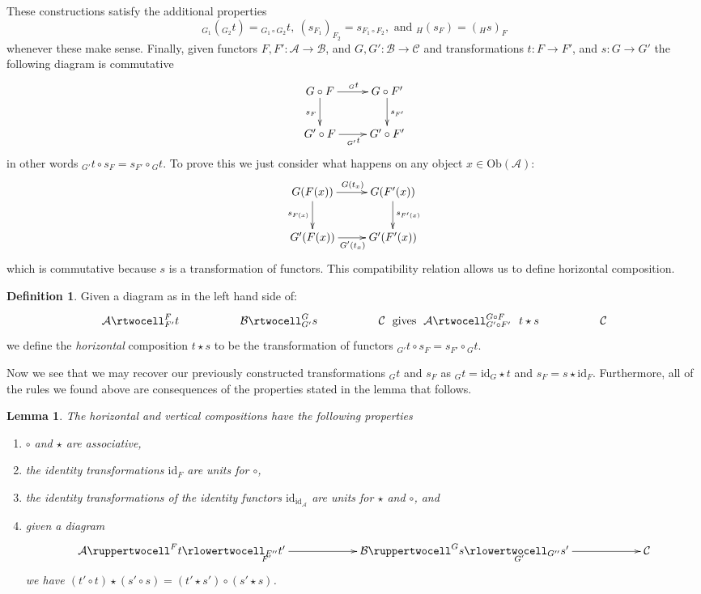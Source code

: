 \documentclass{amsart}
\newtheorem{lemma}[theorem]{Lemma}
\theoremstyle{definition}
\newtheorem{definition}[theorem]{Definition}
\theoremstyle{remark}
\numberwithin{equation}{subsection}
\begin{document}
\medskip\noindent
These constructions satisfy the additional properties
$$
{}_{G_1}({}_{G_2}t) = {}_{G_1\circ G_2}t,\ 
(s_{F_1})_{F_2} = s_{F_1 \circ F_2}, \text{ and }
{}_H(s_F) = ({}_Hs)_F
$$
whenever these make sense.
Finally, given functors $F, F' : \mathcal{A} \to \mathcal{B}$,
and $G, G' : \mathcal{B} \to \mathcal{C}$ and transformations
$t : F \to F'$, and $s : G \to G'$ the following
diagram is commutative
$$
\xymatrix{
G \circ F \ar[r]^{{}_Gt} \ar[d]_{s_F}
&
G \circ F' \ar[d]^{s_{F'}} \\
G' \circ F \ar[r]_{{}_{G'}t}
&
G' \circ F'
}
$$
in other words ${}_{G'}t \circ s_F =  s_{F'}\circ {}_Gt$.
To prove this we just consider what happens on
any object $x \in \text{Ob}(\mathcal{A})$:
$$
\xymatrix{
G(F(x)) \ar[r]^{G(t_{x})} \ar[d]_{s_{F(x)}}
&
G(F'(x)) \ar[d]^{s_{F'(x)}} \\
G'(F(x)) \ar[r]_{G'(t_{x})}
&
G'(F'(x))
}
$$
which is commutative because $s$ is a transformation
of functors. This compatibility relation allows us
to define horizontal composition.

\begin{definition}
\label{definition-horizontal-composition}
Given a diagram as in the left hand side of:
$$
\xymatrixcolsep{4pc}
\xymatrix{
\mathcal{A}
\rtwocell^F_{F'}{t}
&
\mathcal{B}
\rtwocell^G_{G'}{s}
&
\mathcal{C}
} 
\text{ gives }
\xymatrix{
\mathcal{A}
\rtwocell^{G \circ F} _{G' \circ F'}{\ \ t \star s}
&
\mathcal{C}
}
$$
we define the {\it horizontal} composition $t \star s$ to be the
transformation of functors ${}_{G'}t \circ s_F =  s_{F'}\circ {}_Gt$.
\end{definition}

\noindent
Now we see that we may recover our previously constructed
transformations ${}_Gt$ and $s_F$ as
$ {}_Gt = \text{id}_G \star t $ and $ s_F = s \star \text{id}_F $.
Furthermore, all of the rules we found above are consequences of
the properties stated in the lemma that follows.

\begin{lemma}
\label{lemma-properties-2-cat-cats}
The horizontal and vertical compositions have the following
properties
\begin{enumerate}
\item $\circ$ and $\star$ are associative,
\item the identity transformations $\text{id}_F$ 
are units for $\circ$,
\item the identity transformations of the identity functors
$\text{id}_{\text{id}_{\mathcal{A}}}$
are units for $\star$ and $\circ$, and
\item given a diagram
$$
\xymatrixcolsep{5pc}
\xymatrix{
\mathcal{A}
\ruppertwocell^F{t}
\ar[r]_(.3){F'}
\rlowertwocell_{F''}{t'}
&
\mathcal{B}
\ruppertwocell^G{s}
\ar[r]_(.3){G'}
\rlowertwocell_{G''}{s'}
&
\mathcal{C}
}
$$
we have $ (t' \circ t) \star (s' \circ s) = (t' \star s') \circ
(s' \star s)$.
\end{enumerate}
\end{lemma}
\end{document}
